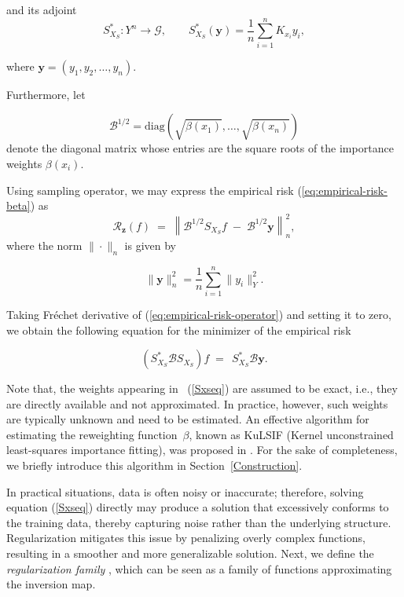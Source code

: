 \documentclass[twoside,11pt]{article}
\begin{document}
\noindent
and its adjoint 
\[
S_{X_S}^* : Y^n \longrightarrow \mathcal{G}, 
\qquad 
S_{X_S}^*(\mathbf{y}) = \frac{1}{n} \sum_{i=1}^n  K_{x_i}y_i  ,
\]

\noindent
where $\mathbf{y} = ( y_1,y_2,\ldots, y_n ).$

\vspace{0.3em}

Furthermore, let  

\[
\mathcal B^{1/2}
= \mathrm{diag}\left(\sqrt{\beta(x_1)}, \dots, \sqrt{\beta(x_n)}\right)
\]
denote the diagonal matrix whose entries are the square roots of the importance weights $\beta(x_i)$.

\vspace{0.6em}

\noindent
Using sampling operator, we may express the empirical risk (\ref{eq:empirical-risk-beta}) as
\begin{equation} \label{eq:empirical-risk-operator}
    \mathcal{R}_\mathbf{z}(f) \;=\; \left\|\mathcal B^{1/2} S_{X_S} f \;-\; \mathcal B^{1/2} \mathbf{y} \right\|_n^2,
\end{equation}
where the norm $\|\cdot\|_n$ is given by

\[
\| \mathbf{y} \|_n^2 = \frac{1}{n} \sum_{i=1}^n \| y_i \|_Y^2.
\]

\noindent
Taking  Fréchet derivative of (\ref{eq:empirical-risk-operator}) and setting it to zero, we obtain the following equation for the minimizer of the empirical risk

\begin{equation}\label{Sxseq}
       \left(S_{X_S}^* \mathcal B S_{X_S}\right) f \;=\;  \, S_{X_S}^* \mathcal B \mathbf{y}.
\end{equation}

\begin{remark}
  Note that, the weights appearing in ~(\ref{Sxseq}) are assumed to be {exact}, 
i.e., they are directly available and not approximated. 
In practice, however, such weights are typically unknown and need to be estimated.
An effective algorithm for estimating the reweighting function~$\beta$, known as 
KuLSIF (Kernel unconstrained least-squares importance fitting), 
was proposed in \cite{IWRLS1}. 
For the sake of completeness, we briefly introduce this algorithm in 
Section~\ref{Construction}.

\end{remark}


In practical situations, data is often noisy or inaccurate; therefore, solving equation (\ref{Sxseq}) directly may produce a solution that excessively conforms to the training data, thereby capturing noise rather than the underlying structure. Regularization mitigates this issue by penalizing overly complex functions, resulting in a smoother and more generalizable solution. Next, we define the \emph{regularization family} \cite{regularization}, which can be seen as a family of functions 
approximating the inversion map.
\end{document}
